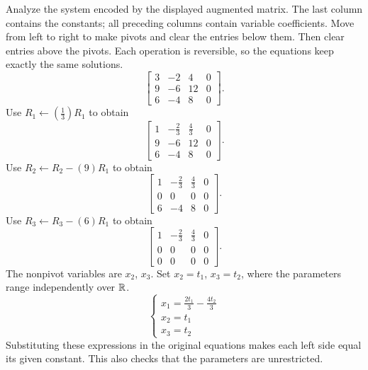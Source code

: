 \goal Analyze the system encoded by the displayed augmented matrix. The last column contains the constants; all preceding columns contain variable coefficients.
\idea Move from left to right to make pivots and clear the entries below them. Then clear entries above the pivots. Each operation is reversible, so the equations keep exactly the same solutions.
\[ \left[\begin{array}{rrr|r}3&-2&4&0\\9&-6&12&0\\6&-4&8&0\end{array}\right].\]
Use $R_{1}\leftarrow(\frac{1}{3})R_{1}$ to obtain
\[ \left[\begin{array}{rrr|r}1&- \frac{2}{3}&\frac{4}{3}&0\\9&-6&12&0\\6&-4&8&0\end{array}\right].\]
Use $R_{2}\leftarrow R_{2}-(9)R_{1}$ to obtain
\[ \left[\begin{array}{rrr|r}1&- \frac{2}{3}&\frac{4}{3}&0\\0&0&0&0\\6&-4&8&0\end{array}\right].\]
Use $R_{3}\leftarrow R_{3}-(6)R_{1}$ to obtain
\[ \left[\begin{array}{rrr|r}1&- \frac{2}{3}&\frac{4}{3}&0\\0&0&0&0\\0&0&0&0\end{array}\right].\]
The nonpivot variables are $x_{2}$, $x_{3}$. Set $x_{2}=t_{1}$, $x_{3}=t_{2}$, where the parameters range independently over $\mathbb{R}$.
\[ \begin{cases}x_{1}=\frac{2 t_{1}}{3} - \frac{4 t_{2}}{3}\\x_{2}=t_{1}\\x_{3}=t_{2}\end{cases}\]
Substituting these expressions in the original equations makes each left side equal its given constant. This also checks that the parameters are unrestricted.

